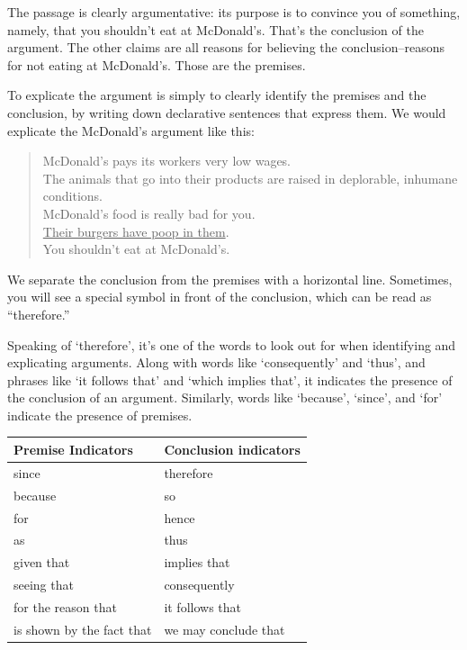 The passage is clearly argumentative: its purpose is to convince you of something, namely, that
you shouldn't eat at McDonald's. That's the conclusion of the argument. The other claims are all
reasons for believing the conclusion--reasons for not eating at McDonald's. Those are the
premises.

To explicate the argument is simply to clearly identify the premises and the conclusion, by writing
down declarative sentences that express them. We would explicate the McDonald's argument like
this:

\begin{quote}
\noindent
McDonald's pays its workers very low wages. \\
The animals that go into their products are raised in deplorable, inhumane conditions. \\
McDonald's food is really bad for you. \\
\underline{Their burgers have poop in them}. \\
You shouldn't eat at McDonald's.
\end{quote}

We separate the conclusion from the premises with a horizontal line. Sometimes, you will see a special symbol
in front of the conclusion, which can be read as ``therefore.''

Speaking of `therefore', it's one of the words to look out for when identifying and explicating
arguments. Along with words like `consequently' and `thus', and phrases like `it follows that' and
`which implies that', it indicates the presence of the conclusion of an argument. Similarly, words
like `because', `since', and `for' indicate the presence of premises.\\


\begin{table}[htp]
\begin{tabular}{|l|l|}
\hline
\textbf{Premise Indicators}        & \textbf{Conclusion indicators} \\
\hline
since                     & therefore             \\
because                   & so                    \\
for                       & hence                 \\
as                        & thus                  \\
given that                & implies that          \\
seeing that               & consequently          \\
for the reason that       & it follows that       \\
is shown by the fact that & we may conclude that \\
\hline
\end{tabular}
\end{table}

